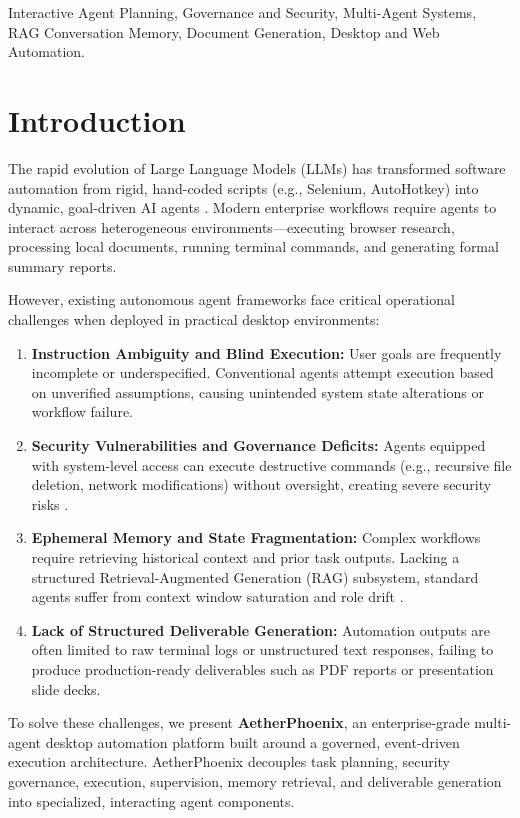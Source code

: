 \documentclass[conference]{IEEEtran}
\begin{document}
\begin{IEEEkeywords}
Interactive Agent Planning, Governance and Security, Multi-Agent Systems, RAG Conversation Memory, Document Generation, Desktop and Web Automation.
\end{IEEEkeywords}

\section{Introduction}
\label{sec:intro}
The rapid evolution of Large Language Models (LLMs) has transformed software automation from rigid, hand-coded scripts (e.g., Selenium, AutoHotkey) into dynamic, goal-driven AI agents \cite{bajoria2026}. Modern enterprise workflows require agents to interact across heterogeneous environments—executing browser research, processing local documents, running terminal commands, and generating formal summary reports. 

However, existing autonomous agent frameworks face critical operational challenges when deployed in practical desktop environments:
\begin{enumerate}
    \item \textbf{Instruction Ambiguity and Blind Execution:} User goals are frequently incomplete or underspecified. Conventional agents attempt execution based on unverified assumptions, causing unintended system state alterations or workflow failure.
    \item \textbf{Security Vulnerabilities and Governance Deficits:} Agents equipped with system-level access can execute destructive commands (e.g., recursive file deletion, network modifications) without oversight, creating severe security risks \cite{guo2026}.
    \item \textbf{Ephemeral Memory and State Fragmentation:} Complex workflows require retrieving historical context and prior task outputs. Lacking a structured Retrieval-Augmented Generation (RAG) subsystem, standard agents suffer from context window saturation and role drift \cite{wang2026}.
    \item \textbf{Lack of Structured Deliverable Generation:} Automation outputs are often limited to raw terminal logs or unstructured text responses, failing to produce production-ready deliverables such as PDF reports or presentation slide decks.
\end{enumerate}

To solve these challenges, we present \textbf{AetherPhoenix}, an enterprise-grade multi-agent desktop automation platform built around a governed, event-driven execution architecture. AetherPhoenix decouples task planning, security governance, execution, supervision, memory retrieval, and deliverable generation into specialized, interacting agent components.
\end{document}
